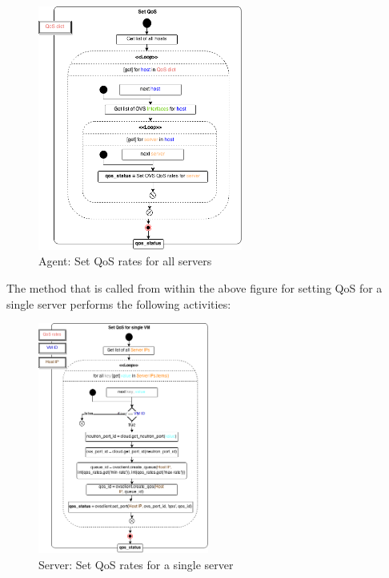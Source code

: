 \begin{figure}[H]
\centering

\includegraphics[width=0.6\textwidth]{images/implementation/cma_set_qos}

\caption{Agent: Set QoS rates for all servers}
\end{figure}

The method that is called from within the above figure for setting QoS for a single server performs the following activities:

\begin{figure}[H]
\centering

\includegraphics[width=0.5\textwidth]{images/implementation/cma_set_qos_single_server}

\caption{Server: Set QoS rates for a single server}
\end{figure}

